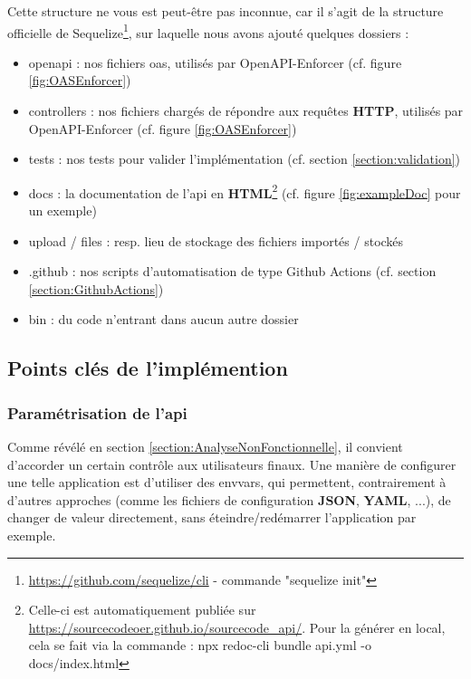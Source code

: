 Cette structure ne vous est peut-être pas inconnue, car il s'agit de la structure officielle de Sequelize\footnote{
    \url{https://github.com/sequelize/cli} - commande "sequelize init"
}, sur laquelle nous avons ajouté quelques dossiers :

\begin{itemize}
    \item openapi : nos fichiers \Gls{oas}, utilisés par OpenAPI-Enforcer (cf. figure \ref{fig:OASEnforcer})
    \item controllers : nos fichiers chargés de répondre aux requêtes \textbf{HTTP}, utilisés par OpenAPI-Enforcer (cf. figure \ref{fig:OASEnforcer})
    \item tests : nos tests pour valider l'implémentation (cf. section \ref{section:validation})
    \item docs : la documentation de l'\Gls{api} en \textbf{HTML}\footnote{
        Celle-ci est automatiquement publiée sur 
        \href{https://sourcecodeoer.github.io/sourcecode\_api/}{https://sourcecodeoer.github.io/sourcecode\_api/}.
        Pour la générer en local, cela se fait via la commande : 
        npx redoc-cli bundle api.yml -o docs/index.html 
    } (cf. figure \ref{fig:exampleDoc} pour un exemple)
    \item upload / files : resp. lieu de stockage des fichiers importés / stockés 
    \item .github : nos scripts d'automatisation de type Github Actions (cf. section \ref{section:GithubActions}) 
    \item bin : du code n'entrant dans aucun autre dossier
\end{itemize}

\pagebreak
\subsection{Points clés de l'implémention}

\subsubsection{Paramétrisation de l'\Gls{api}}
\label{section:apiConfig}

Comme révélé en section \ref{section:AnalyseNonFonctionnelle}, il convient d'accorder un certain contrôle aux utilisateurs finaux.
Une manière de configurer une telle application est d'utiliser des \glspl{envvar}, 
qui permettent, contrairement à d'autres approches (comme les fichiers de configuration \textbf{JSON}, \textbf{YAML}, ...), 
de changer de valeur directement, sans éteindre/redémarrer l'application par exemple. \\

